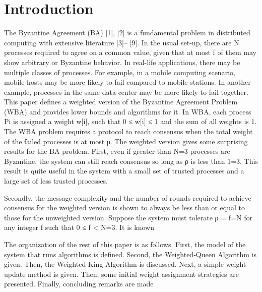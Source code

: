 \documentclass[conference]{IEEEtran}
\begin{document}
\section{Introduction}
The Byzantine Agreement (BA) [1], [2] is a fundamental
problem in distributed computing with extensive literature [3]–
[9]. In the usual set-up, there are N processes required to agree
on a common value, given that at most f of them may show
arbitrary or Byzantine behavior. In real-life applications, there
may be multiple classes of processes. For example, in a mobile
computing scenario, mobile hosts may be more likely to fail
compared to mobile stations. In another example, processes in
the same data center may be more likely to fail together. This
paper defines a weighted version of the Byzantine Agreement
Problem (WBA) and provides lower bounds and algorithms
for it. In WBA, each process Pi is assigned a weight w[i],
such that 0 ≤ w[i] ≤ 1 and the sum of all weights is 1.
The WBA problem requires a protocol to reach consensus
when the total weight of the failed processes is at most ρ.
The weighted version gives some surprising results for the
BA problem. First, even if greater than N=3 processes are
Byzantine, the system can still reach consensus so long as ρ
is less than 1=3. This result is quite useful in the system with
a small set of trusted processes and a large set of less trusted
processes.

Secondly, the message complexity and the number of rounds
required to achieve consensus for the weighted version is
shown to always be less than or equal to those for the unweighted version. Suppose the system must tolerate ρ = f=N
for any integer f such that 0 ≤ f < N=3. It is known 

The organization of the rest of this paper is as follows.
First, the model of the system that runs algorithms is defined.
Second, the Weighted-Queen Algorithm is given. Then, the
Weighted-King Algorithm is discussed. Next, a simple weight
update method is given. Then, some initial weight assignment
strategies are presented. Finally, concluding remarks are made
\end{document}
